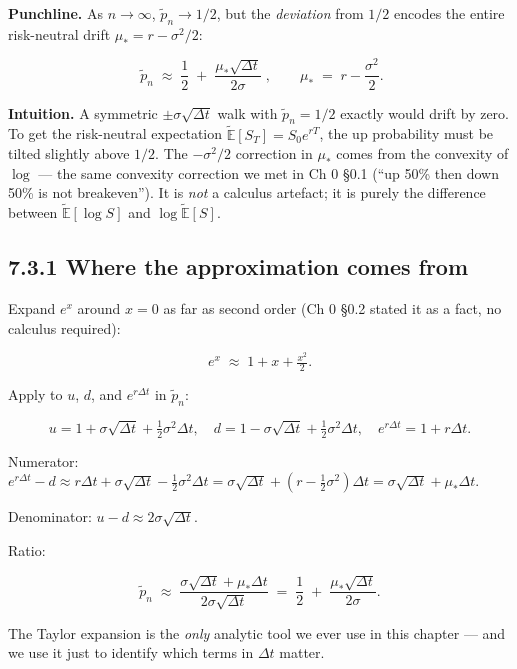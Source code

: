 \documentclass[
  10pt,
  twoside]{book}
\begin{document}
\textbf{Punchline.} As \(n\to\infty\), \(\tilde p_n \to 1/2\), but the
\emph{deviation} from \(1/2\) encodes the entire risk-neutral drift
\(\mu_* = r - \sigma^2/2\):

\[\boxed{\; \tilde p_n \;\approx\; \frac{1}{2} \;+\; \frac{\mu_*\sqrt{\Delta t}}{2\sigma} \;}, \qquad \mu_* \;=\; r - \frac{\sigma^2}{2}.\]

\textbf{Intuition.} A symmetric \(\pm \sigma\sqrt{\Delta t}\) walk with
\(\tilde p_n = 1/2\) exactly would drift by zero. To get the
risk-neutral expectation \(\tilde{\mathbb E}[S_T] = S_0 e^{rT}\), the up
probability must be tilted slightly above \(1/2\). The \(-\sigma^2/2\)
correction in \(\mu_*\) comes from the convexity of \(\log\) --- the
same convexity correction we met in Ch 0 §0.1 (``up 50\% then down 50\%
is not breakeven''). It is \emph{not} a calculus artefact; it is purely
the difference between \(\tilde{\mathbb E}[\log S]\) and
\(\log \tilde{\mathbb E}[S]\).

\subsection{7.3.1 Where the approximation comes
from}\label{where-the-approximation-comes-from}

Expand \(e^{x}\) around \(x = 0\) as far as second order (Ch 0 §0.2
stated it as a fact, no calculus required):

\[e^x \;\approx\; 1 + x + \tfrac{x^2}{2}.\]

Apply to \(u\), \(d\), and \(e^{r\Delta t}\) in \(\tilde p_n\):

\[u = 1 + \sigma\sqrt{\Delta t} + \tfrac{1}{2}\sigma^2 \Delta t, \quad d = 1 - \sigma\sqrt{\Delta t} + \tfrac{1}{2}\sigma^2 \Delta t, \quad e^{r\Delta t} = 1 + r\Delta t.\]

Numerator:
\(e^{r\Delta t} - d \approx r\Delta t + \sigma\sqrt{\Delta t} - \tfrac{1}{2}\sigma^2 \Delta t = \sigma\sqrt{\Delta t} + (r - \tfrac{1}{2}\sigma^2)\Delta t = \sigma\sqrt{\Delta t} + \mu_*\Delta t\).

Denominator: \(u - d \approx 2\sigma\sqrt{\Delta t}\).

Ratio:

\[\tilde p_n \;\approx\; \frac{\sigma\sqrt{\Delta t} + \mu_* \Delta t}{2\sigma\sqrt{\Delta t}} \;=\; \frac{1}{2} \;+\; \frac{\mu_* \sqrt{\Delta t}}{2\sigma}.\]

The Taylor expansion is the \emph{only} analytic tool we ever use in
this chapter --- and we use it just to identify which terms in
\(\Delta t\) matter.
\end{document}
